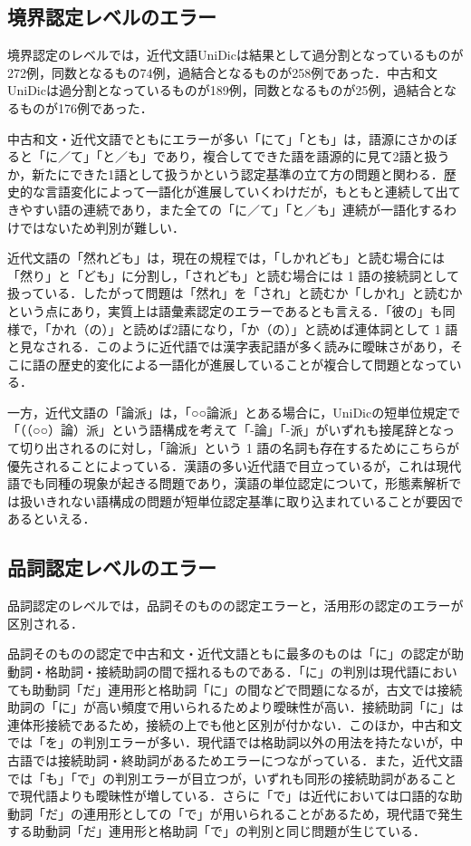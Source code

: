\documentclass[japanese]{jnlp_1.4}
\begin{document}
\subsection{境界認定レベルのエラー}

境界認定のレベルでは，近代文語UniDicは結果として過分割となっているものが272例，同数となるもの74例，過結合となるものが258例であった．中古和文UniDicは過分割となっているものが189例，同数となるものが25例，過結合となるものが176例であった．

中古和文・近代文語でともにエラーが多い「にて」「とも」は，語源にさかのぼると「に／て」「と／も」であり，複合してできた語を語源的に見て2語と扱うか，新たにできた1語として扱うかという認定基準の立て方の問題と関わる．歴史的な言語変化によって一語化が進展していくわけだが，もともと連続して出てきやすい語の連続であり，また全ての「に／て」「と／も」連続が一語化するわけではないため判別が難しい． 

近代文語の「然れども」は，現在の規程では，「しかれども」と読む場合には「然り」と「ども」に分割し，「されども」と読む場合には 1 語の接続詞として扱っている．したがって問題は「然れ」を「され」と読むか「しかれ」と読むかという点にあり，実質上は語彙素認定のエラーであるとも言える．「彼の」も同様で，「かれ（の）」と読めば2語になり，「か（の）」と読めば連体詞として 1 語と見なされる．このように近代語では漢字表記語が多く読みに曖昧さがあり，そこに語の歴史的変化による一語化が進展していることが複合して問題となっている．

一方，近代文語の「論派」は，「○○論派」とある場合に，UniDicの短単位規定で「（（○○）論）派」という語構成を考えて「-論」「-派」がいずれも接尾辞となって切り出されるのに対し，「論派」という 1 語の名詞も存在するためにこちらが優先されることによっている．漢語の多い近代語で目立っているが，これは現代語でも同種の現象が起きる問題であり，漢語の単位認定について，形態素解析では扱いきれない語構成の問題が短単位認定基準に取り込まれていることが要因であるといえる．


\subsection{品詞認定レベルのエラー}

品詞認定のレベルでは，品詞そのものの認定エラーと，活用形の認定のエラーが区別される． 

品詞そのものの認定で中古和文・近代文語ともに最多のものは「に」の認定が助動詞・格助詞・接続助詞の間で揺れるものである．「に」の判別は現代語においても助動詞「だ」連用形と格助詞「に」の間などで問題になるが，古文では接続助詞の「に」が高い頻度で用いられるためより曖昧性が高い．接続助詞「に」は連体形接続であるため，接続の上でも他と区別が付かない．このほか，中古和文では「を」の判別エラーが多い．現代語では格助詞以外の用法を持たないが，中古語では接続助詞・終助詞があるためエラーにつながっている．また，近代文語では「も」「で」の判別エラーが目立つが，いずれも同形の接続助詞があることで現代語よりも曖昧性が増している．さらに「で」は近代においては口語的な助動詞「だ」の連用形としての「で」が用いられることがあるため，現代語で発生する助動詞「だ」連用形と格助詞「で」の判別と同じ問題が生じている．
\end{document}
